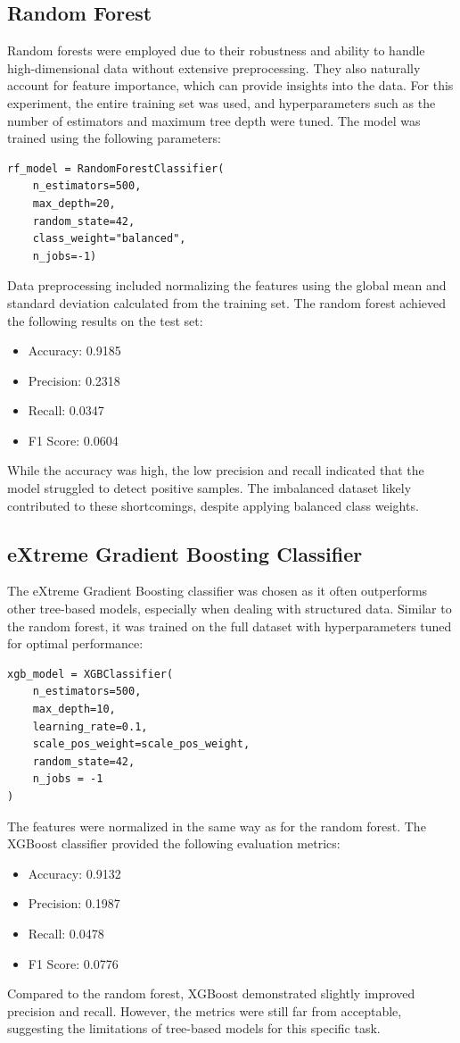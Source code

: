 \documentclass[8pt,a4paper]{article}
\begin{document}
\subsection{Random Forest}
Random forests were employed due to their robustness and ability to handle high-dimensional data without extensive preprocessing. They also naturally account for feature importance, which can provide insights into the data. For this experiment, the entire training set was used, and hyperparameters such as the number of estimators and maximum tree depth were tuned.
The model was trained using the following parameters:
\begin{lstlisting}
rf_model = RandomForestClassifier(
	n_estimators=500,
	max_depth=20,
	random_state=42,
	class_weight="balanced",
	n_jobs=-1)
\end{lstlisting}
Data preprocessing included normalizing the features using the global mean and standard deviation calculated from the training set. The random forest achieved the following results on the test set:
\begin{itemize}
\item Accuracy: 0.9185
\item Precision: 0.2318
\item Recall: 0.0347
\item F1 Score: 0.0604
\end{itemize}
While the accuracy was high, the low precision and recall indicated that the model struggled to detect positive samples. The imbalanced dataset likely contributed to these shortcomings, despite applying balanced class weights.

\subsection{eXtreme Gradient Boosting Classifier}

The eXtreme Gradient Boosting classifier was chosen as it often outperforms other tree-based models, especially when dealing with structured data. Similar to the random forest, it was trained on the full dataset with hyperparameters tuned for optimal performance:

\begin{lstlisting}
xgb_model = XGBClassifier(
    n_estimators=500,
    max_depth=10,
    learning_rate=0.1,
    scale_pos_weight=scale_pos_weight,
    random_state=42,
    n_jobs = -1
)
\end{lstlisting}
The features were normalized in the same way as for the random forest. The XGBoost classifier provided the following evaluation metrics:
\begin{itemize}
\item Accuracy: 0.9132
\item Precision: 0.1987
\item Recall: 0.0478
\item F1 Score: 0.0776
\end{itemize}
Compared to the random forest, XGBoost demonstrated slightly improved precision and recall. However, the metrics were still far from acceptable, suggesting the limitations of tree-based models for this specific task.
\end{document}
